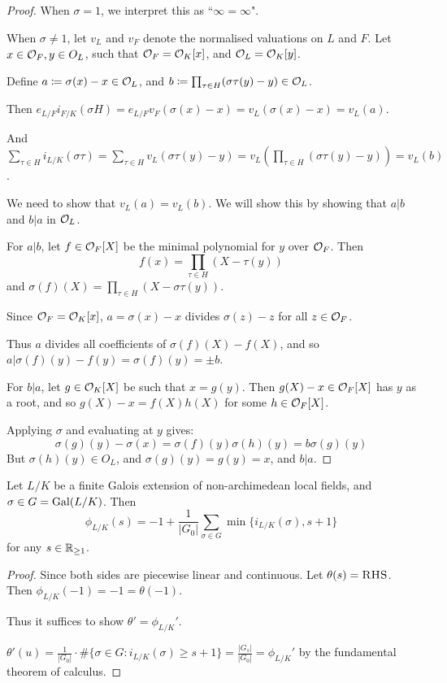 \documentclass[10pt,a4paper]{article}
\begin{document}
\begin{proof}
  When $\sigma = 1$, we interpret this as ``$\infty = \infty$".

  When $\sigma \neq 1$, let $v_L$ and $v_F$ denote the normalised valuations on $L$ and $F$. Let $x \in \mathcal{O}_F, y \in O_L$, such that $\mathcal{O}_F = \mathcal{O}_K[x]$, and $\mathcal{O}_L = \mathcal{O}_K[y]$.

  Define $a \coloneqq \sigma(x)-x \in \mathcal{O}_L$, and $b \coloneqq \prod_{\tau \in H} (\sigma\tau(y)-y) \in \mathcal{O}_L$.

  Then $e_{L/F}i_{F/K}(\sigma H) = e_{L/F}v_F(\sigma(x)-x) = v_L(\sigma(x)-x) = v_L(a)$.

  And $\sum_{\tau \in H} i_{L/K}(\sigma \tau) = \sum_{\tau \in H}v_L(\sigma\tau(y)-y) = v_L(\prod_{\tau \in H}(\sigma \tau(y)-y)) = v_L(b)$.

  We need to show that $v_L(a) = v_L(b)$. We will show this by showing that $a|b$ and $b|a$ in $\mathcal{O}_L$.

  For $a|b$, let $f \in \mathcal{O}_F[X]$ be the minimal polynomial for $y$ over $\mathcal{O}_F$. Then
  \[f(x) = \prod_{\tau \in H} (X-\tau(y))\]
  and $\sigma(f)(X) = \prod_{\tau \in H} (X -\sigma\tau(y))$.

  Since $\mathcal{O}_F = \mathcal{O}_K[x]$, $a = \sigma(x)-x$ divides $\sigma(z)-z$ for all $z \in \mathcal{O}_F$.

  Thus $a$ divides all coefficients of $\sigma(f)(X) - f(X)$, and so $a|\sigma(f)(y)-f(y) = \sigma(f)(y) = \pm b$.

  For $b|a$, let $g \in \mathcal{O}_K[X]$ be such that $x = g(y)$. Then $g(X)-x \in \mathcal{O}_F[X]$ has $y$ as a root, and so $g(X)-x = f(X)h(X)$ for some $h \in \mathcal{O}_F[X]$.

  Applying $\sigma$ and evaluating at $y$ gives:
  \[\sigma(g)(y) - \sigma(x) = \sigma(f)(y)\sigma(h)(y) = b\sigma(g)(y)\]
  But $\sigma(h)(y) \in O_L$, and $\sigma(g)(y) = g(y) = x$, and $b |a$.
\end{proof}
\begin{lemma}
  Let $L/K$ be a finite Galois extension of non-archimedean local fields, and $\sigma \in G = \operatorname{Gal}(L/K)$. Then
  \[\phi_{L/K}(s) = -1 + \frac{1}{|G_0|}\sum_{\sigma \in G} \min\{i_{L/K}(\sigma), s+1\}\]
  for any $s \in \mathbb{R}_{\geq 1}$.
\end{lemma}
\begin{proof}
  Since both sides are piecewise linear and continuous. Let $\theta(s) = \textsc{RHS}$. Then $\phi_{L/K}(-1) = -1 = \theta(-1)$.

  Thus it suffices to show $\theta' = \phi_{L/K}'$.

  $\theta'(u) = \frac{1}{|G_0|}\cdot \#\{\sigma \in G : i_{L/K}(\sigma) \geq s+1\} = \frac{|G_s|}{|G_0|} = \phi_{L/K}'$ by the fundamental theorem of calculus.
\end{proof}
\end{document}
